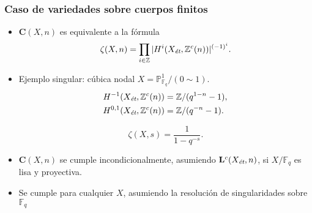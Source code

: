 \documentclass[handout]{beamer}
\newcommand{\FF}{\mathbb{F}}
\newcommand{\PP}{\mathbb{P}}
\newcommand{\ZZ}{\mathbb{Z}}
\newcommand{\et}{\text{\it ét}}
\begin{document}

\begin{frame}
  \frametitle{Caso de variedades sobre cuerpos finitos}

  \begin{itemize}
  \item $\mathbf{C} (X,n)$ es equivalente a la fórmula
    \[ \zeta (X,n) = \prod_{i \in \ZZ} |H^i (X_\et, \ZZ^c (n))|^{(-1)^i}. \]

  \item Ejemplo singular: cúbica nodal $X = \PP^1_{\FF_q} / (0\sim 1)$.
    \begin{align*}
      H^{-1} (X_\et, \ZZ^c (n)) & = \ZZ/(q^{1-n} - 1), \\
      H^{0,1} (X_\et, \ZZ^c (n)) & = \ZZ/(q^{-n} - 1).
    \end{align*}

    \[ \zeta (X,s) = \frac{1}{1 - q^{-s}}. \]

  \item $\mathbf{C} (X,n)$ se cumple incondicionalmente, asumiendo
    $\mathbf{L}^c (X_\et, n)$, si $X/\FF_q$ es lisa y proyectiva.

  \item Se cumple para cualquier $X$, asumiendo la resolución de singularidades
    sobre $\FF_q$
  \end{itemize}
\end{frame}

\end{document}
